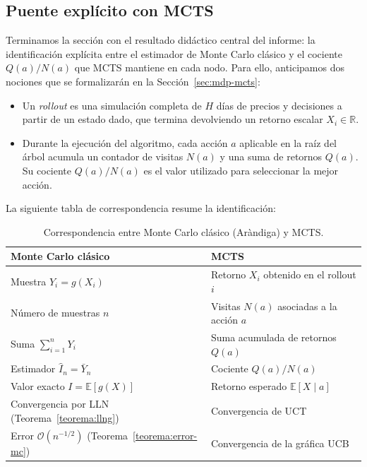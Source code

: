 \subsection{Puente explícito con MCTS}
\label{subsec:puente-mcts}

Terminamos la sección con el resultado didáctico central del informe: la identificación explícita entre el estimador de Monte Carlo clásico y el cociente $Q(a)/N(a)$ que MCTS mantiene en cada nodo. Para ello, anticipamos dos nociones que se formalizarán en la Sección~\ref{sec:mdp-mcts}:

\begin{itemize}
    \item Un \emph{rollout} es una simulación completa de $H$ días de precios y decisiones a partir de un estado dado, que termina devolviendo un retorno escalar $X_i \in \mathbb{R}$.
    \item Durante la ejecución del algoritmo, cada acción $a$ aplicable en la raíz del árbol acumula un contador de visitas $N(a)$ y una suma de retornos $Q(a)$. Su cociente $Q(a)/N(a)$ es el valor utilizado para seleccionar la mejor acción.
\end{itemize}

La siguiente tabla de correspondencia resume la identificación:

\begin{table}[H]
\centering
\caption{Correspondencia entre Monte Carlo clásico (Aràndiga) y MCTS.}
\label{tab:correspondencia-mc-mcts}
\begin{tabular}{ll}
\toprule
\textbf{Monte Carlo clásico} & \textbf{MCTS} \\
\midrule
Muestra $Y_i = g(X_i)$ & Retorno $X_i$ obtenido en el rollout $i$ \\
Número de muestras $n$ & Visitas $N(a)$ asociadas a la acción $a$ \\
Suma $\sum_{i=1}^n Y_i$ & Suma acumulada de retornos $Q(a)$ \\
Estimador $\widehat{I}_n = \bar{Y}_n$ & Cociente $Q(a)/N(a)$ \\
Valor exacto $I = \mathbb{E}[g(X)]$ & Retorno esperado $\mathbb{E}[X \mid a]$ \\
Convergencia por LLN (Teorema~\ref{teorema:llng}) & Convergencia de UCT \\
Error $\mathcal{O}(n^{-1/2})$ (Teorema~\ref{teorema:error-mc}) & Convergencia de la gráfica UCB \\
\bottomrule
\end{tabular}
\end{table}

